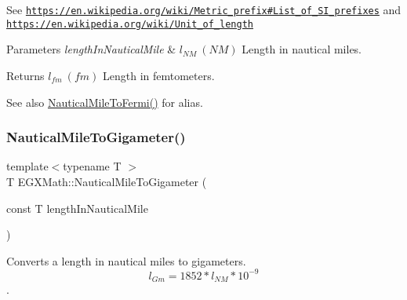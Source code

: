 See \href{https://en.wikipedia.org/wiki/Metric_prefix#List_of_SI_prefixes}{\tt https\+://en.\+wikipedia.\+org/wiki/\+Metric\+\_\+prefix\#\+List\+\_\+of\+\_\+\+S\+I\+\_\+prefixes} and \href{https://en.wikipedia.org/wiki/Unit_of_length}{\tt https\+://en.\+wikipedia.\+org/wiki/\+Unit\+\_\+of\+\_\+length} 
\begin{DoxyParams}{Parameters}
{\em length\+In\+Nautical\+Mile} & $ l_{NM}\ (NM)$ Length in nautical miles. \\
\hline
\end{DoxyParams}
\begin{DoxyReturn}{Returns}
$ l_{fm}\ (fm)$ Length in femtometers. 
\end{DoxyReturn}
\begin{DoxySeeAlso}{See also}
\mbox{\hyperlink{group___e_g_x_math-_conversions-_length_conversions-_nautical-_nautical_mile-_non-_s_i_gaa4b84422943c37e49e5c3abdc7f301e4}{Nautical\+Mile\+To\+Fermi()}} for alias. 
\end{DoxySeeAlso}
\mbox{\label{group___e_g_x_math-_conversions-_length_conversions-_nautical-_nautical_mile-_s_i_ga88b5a7dada605b923f1855f3ea4d4dc0}} 
\subsubsection{\texorpdfstring{Nautical\+Mile\+To\+Gigameter()}{NauticalMileToGigameter()}}
{\footnotesize\ttfamily template$<$typename T $>$ \\
T E\+G\+X\+Math\+::\+Nautical\+Mile\+To\+Gigameter (\begin{DoxyParamCaption}\item[{const T}]{length\+In\+Nautical\+Mile }\end{DoxyParamCaption})}



Converts a length in nautical miles to gigameters. \[ l_{Gm}=1852 * l_{NM} * 10^{-9} \]. 

